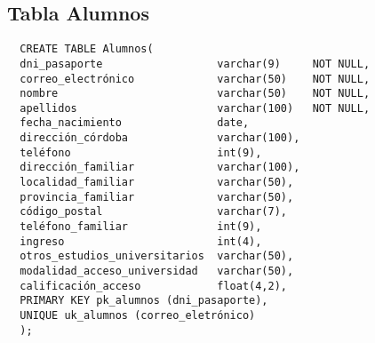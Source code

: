 \subsection{Tabla Alumnos}

\begin{verbatim}
  CREATE TABLE Alumnos(
  dni_pasaporte                  varchar(9)     NOT NULL,
  correo_electrónico             varchar(50)    NOT NULL,
  nombre                         varchar(50)    NOT NULL,
  apellidos                      varchar(100)   NOT NULL,
  fecha_nacimiento               date,
  dirección_córdoba              varchar(100),
  teléfono                       int(9),
  dirección_familiar             varchar(100),
  localidad_familiar             varchar(50),
  provincia_familiar             varchar(50),
  código_postal                  varchar(7),
  teléfono_familiar              int(9),
  ingreso                        int(4),
  otros_estudios_universitarios  varchar(50),
  modalidad_acceso_universidad   varchar(50),
  calificación_acceso            float(4,2),
  PRIMARY KEY pk_alumnos (dni_pasaporte),
  UNIQUE uk_alumnos (correo_eletrónico)
  );
\end{verbatim}
